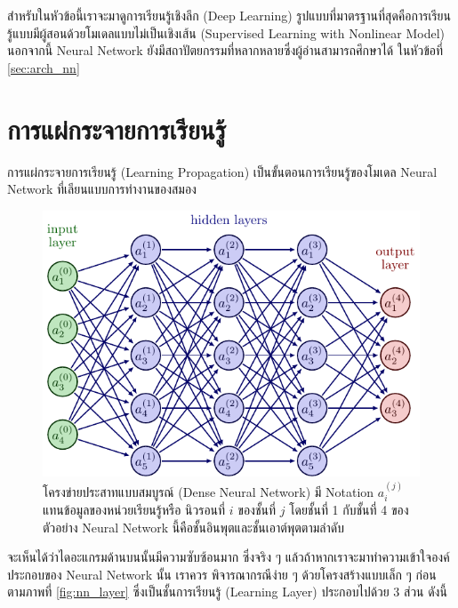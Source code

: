 สำหรับในหัวข้อนี้เราจะมาดูการเรียนรู้เชิงลึก (Deep Learning) รูปแบบที่มาตรฐานที่สุดคือการเรียนรู้แบบมีผู้สอนด้วยโมเดลแบบไม่เป็นเชิงเส้น 
(Supervised Learning with Nonlinear Model) นอกจากนี้ Neural Network ยังมีสถาปัตยกรรมที่หลากหลายซึ่งผู้อ่านสามารถศึกษาได้%
ในหัวข้อที่ \ref{sec:arch_nn}

\section{การแผ่กระจายการเรียนรู้}

การแผ่กระจายการเรียนรู้ (Learning Propagation) เป็นขั้นตอนการเรียนรู้ของโมเดล Neural Network ที่เลียนแบบการทำงานของสมอง 

\begin{figure}[htbp]
    \includegraphics[width=\linewidth]{fig/dense_neural_net.pdf}
    \caption{โครงข่ายประสาทแบบสมบูรณ์ (Dense Neural Network) มี Notation $a^{(j)}_{i}$ แทนข้อมูลของหน่วยเรียนรู้หรือ%
    นิวรอนที่ $i$ ของชั้นที่ $j$ โดยชั้นที่ 1 กับชั้นที่ 4 ของตัวอย่าง Neural Network นี้คือชั้นอินพุตและชั้นเอาต์พุตตามลำดับ}
    \label{fig:dense_neural_net}
\end{figure}

จะเห็นได้ว่าไดอะแกรมด้านบนนั้นมีความซับซ้อนมาก ซึ่งจริง ๆ แล้วถ้าหากเราจะมาทำความเข้าใจองค์ประกอบของ Neural Network นั้น เราควร%
พิจารณากรณีง่าย ๆ ด้วยโครงสร้างแบบเล็ก ๆ ก่อน ตามภาพที่ \ref{fig:nn_layer} ซึ่งเป็นชั้นการเรียนรู้ (Learning Layer) ประกอบไปด้วย
3 ส่วน ดังนี้

